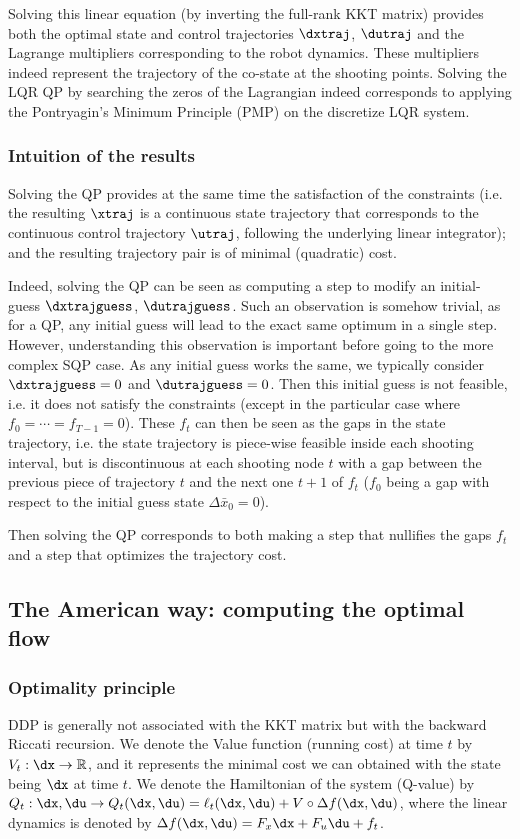 \documentclass[10pt,a4paper]{article}
\begin{document}
Solving this linear equation (by inverting the full-rank KKT matrix) provides both the optimal state and control trajectories $\dxtraj$, $\dutraj$ and the Lagrange multipliers corresponding to the robot dynamics.
These multipliers indeed represent the trajectory of the co-state at the shooting points.
Solving the LQR QP by searching the zeros of the Lagrangian indeed corresponds to applying the Pontryagin's Minimum Principle (PMP) on the discretize LQR system.

\subsubsection{Intuition of the results}
Solving the QP provides at the same time the satisfaction of the constraints (i.e. the resulting $\xtraj$ is a continuous state trajectory that corresponds to the continuous control trajectory $\utraj$, following the underlying linear integrator); and the resulting trajectory pair is of minimal (quadratic) cost.

Indeed, solving the QP can be seen as computing a step to modify an initial-guess $\dxtrajguess$, $\dutrajguess$. Such an observation is somehow trivial, as for a QP, any initial guess will lead to the exact same optimum in a single step.
However, understanding this observation is important before going to the more complex SQP case.
As any initial guess works the same, we typically consider $\dxtrajguess=0$ and $\dutrajguess=0$.
Then this initial guess is not feasible, i.e. it does not satisfy the constraints (except in the particular case where $f_0 = \cdots = f_{T-1} = 0$). These $f_t$ can then be seen as the gaps in the state trajectory, i.e. the state trajectory is piece-wise feasible inside each shooting interval, but is discontinuous at each shooting node $t$ with a gap between the previous piece of trajectory $t$ and the next one $t+1$ of $f_t$ ($f_0$ being a gap with respect to the initial guess state $\Delta \bar x_0= 0$).

Then solving the QP corresponds to both making a step that nullifies the gaps $f_t$ and a step that optimizes the trajectory cost.


\subsection{The American way: computing the optimal flow}

\subsubsection{Optimality principle}
DDP is generally not associated with the KKT matrix but with the backward Riccati recursion.
We denote the Value function (running cost) at time $t$ by $V_t: \dx \rightarrow \mathbb{R}$, and it represents the minimal cost we can obtained with the state being $\dx$ at time $t$.
We denote the Hamiltonian of the system (Q-value) by $Q_t: \dx,\du \rightarrow Q_t(\dx,\du) = \ell_t(\dx,\du) + V \circ \Delta f(\dx,\du)$, where the linear dynamics is denoted by $\Delta f(\dx,\du) = F_x \dx + F_u \du + f_t$.
\end{document}
